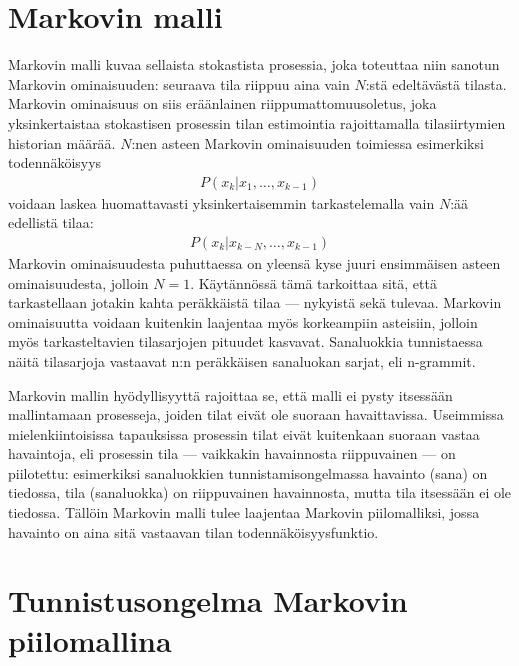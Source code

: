 \documentclass[utf8,bachelor,manualbib]{gradu3}
\begin{document}
\section{Markovin malli}

Markovin malli kuvaa sellaista stokastista prosessia, joka toteuttaa niin sanotun Markovin ominaisuuden: seuraava tila riippuu aina vain $N$:stä edeltävästä tilasta. Markovin ominaisuus on siis eräänlainen riippumattomuusoletus, joka yksinkertaistaa stokastisen prosessin tilan estimointia rajoittamalla tilasiirtymien historian määrää. $N$:nen asteen Markovin ominaisuuden toimiessa esimerkiksi todennäköisyys
\begin{align}
P(x_k | x_1, \ldots, x_{k-1})
\end{align}
voidaan laskea huomattavasti yksinkertaisemmin tarkastelemalla vain $N$:ää edellistä tilaa:
\begin{align}
P(x_k | x_{k - N }, \ldots, x_{k-1})
\end{align}
Markovin ominaisuudesta puhuttaessa on yleensä kyse juuri ensimmäisen asteen ominaisuudesta, jolloin $N=1$. Käytännössä tämä tarkoittaa sitä, että tarkastellaan jotakin kahta peräkkäistä tilaa --- nykyistä sekä tulevaa. Markovin ominaisuutta voidaan kuitenkin laajentaa myös korkeampiin asteisiin, jolloin myös tarkasteltavien tilasarjojen pituudet kasvavat. Sanaluokkia tunnistaessa näitä tilasarjoja vastaavat n:n peräkkäisen sanaluokan sarjat, eli n-grammit. \citep{rabiner1989}

Markovin mallin hyödyllisyyttä rajoittaa se, että malli ei pysty itsessään mallintamaan prosesseja, joiden tilat eivät ole suoraan havaittavissa. Useimmissa mielenkiintoisissa tapauksissa prosessin tilat eivät kuitenkaan suoraan vastaa havaintoja, eli prosessin tila --- vaikkakin havainnosta riippuvainen --- on piilotettu: esimerkiksi sanaluokkien tunnistamisongelmassa havainto (sana) on tiedossa, tila (sanaluokka) on riippuvainen havainnosta, mutta tila itsessään ei ole tiedossa. Tällöin Markovin malli tulee laajentaa Markovin piilomalliksi, jossa havainto on aina sitä vastaavan tilan todennäköisyysfunktio. \citep{rabiner1989}

\section{Tunnistusongelma Markovin piilomallina}
\end{document}
